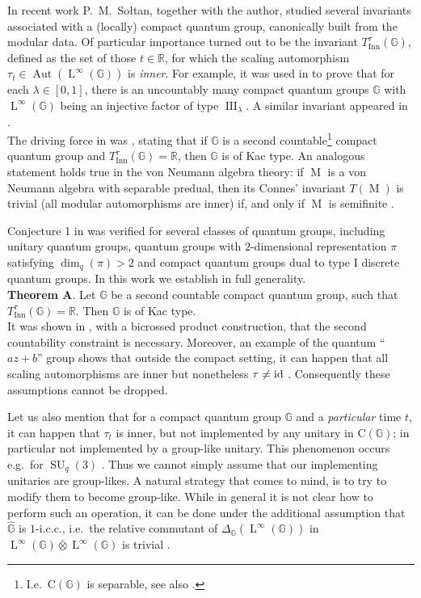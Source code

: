 \documentclass{amsart}
\newcommand{\id}{\textnormal{id}}
\newcommand{\mrm}{\mathrm}
\newcommand{\RR}{\mathbb{R}}
\newcommand{\GG}{\mathbb{G}}
\newcommand{\whG}{\widehat{\GG}}
\newcommand{\oon}{\operatorname}
\DeclareMathOperator{\M}{M}
\DeclareMathOperator{\LL}{L}
\DeclareMathOperator{\SU}{SU}
\DeclareMathOperator{\Inn}{Inn}
\DeclareMathOperator{\Aut}{Aut}
\theoremstyle{definition}
\numberwithin{equation}{section}
\begin{document}
In recent work \cite{KSInvariants} P.~M.~Sołtan, together with the author, studied several invariants associated with a (locally) compact quantum group, canonically built from the modular data. Of particular importance turned out to be the invariant $T^{\tau}_{\Inn}(\GG)$, defined as the set of those $t\in\RR$, for which the scaling automorphism $\tau_t\in \Aut(\LL^{\infty}(\GG))$ is \emph{inner}. For example, it was used in \cite{KSExamples} to prove that for each $\lambda\in \left[0,1\right]$, there is an uncountably many compact quantum groups $\GG$ with $\LL^{\infty}(\GG)$ being an injective factor of type $\oon{III}_\lambda$. A similar invariant appeared in \cite{VaesOuter}.\\

The driving force in \cite{KSInvariants} was \cite[Conjecture 1]{KSInvariants}, stating that if $\GG$ is a second countable\footnote{I.e.~$\mrm{C}(\GG)$ is separable, see also \cite[Lemma 14.6]{KrajczokCoamenability}.} compact quantum group and $T^{\tau}_{\Inn}(\GG)=\RR$, then $\GG$ is of Kac type. An analogous statement holds true in the von Neumann algebra theory: if $\M$ is a von Neumann algebra with separable predual, then its Connes' invariant $T(\M)$ is trivial (all modular automorphisms are inner) if, and only if $\M$ is semifinite \cite[Proposition 27.2]{Stratila}.


Conjecture 1 in \cite{KSInvariants} was verified for several classes of quantum groups, including unitary quantum groups, quantum groups with $2$-dimensional representation $\pi$ satisfying $\dim_q(\pi)>2$ and compact quantum groups dual to type I discrete quantum groups. In this work we establish \cite[Conjecture 1]{KSInvariants} in full generality.\\

\textbf{Theorem A}. Let $\GG$ be a second countable compact quantum group, such that $T^{\tau}_{\oon{Inn}}(\GG)=\RR$. Then $\GG$ is of Kac type.\\

It was shown in \cite[Remark 3.1]{KSInvariants}, with a bicrossed product construction, that the second countability constraint is necessary. Moreover, an example of the quantum ``$az+b$'' group shows that outside the compact setting, it can happen that all scaling automorphisms are inner but nonetheless $\tau\neq \id$ \cite[Section 5.2]{KSInvariants}. Consequently these assumptions cannot be dropped.

Let us also mention that for a compact quantum group $\GG$ and a \emph{particular} time $t$, it can happen that $\tau_t$ is inner, but not implemented by any unitary in $\mrm{C}(\GG)$; in particular not implemented by a group-like unitary. This phenomenon occurs e.g.~for $\SU_q(3)$ \cite[Proposition 4.16]{KSInvariants}. Thus we cannot simply assume that our implementing unitaries are group-likes. A natural strategy that comes to mind, is to try to modify them to become group-like. While in general it is not clear how to perform such an operation, it can be done under the additional assumption that $\whG$ is $1$-i.c.c., i.e.~the relative commutant of $\Delta_{\GG}(\LL^{\infty}(\GG))$ in $\LL^\infty(\GG)\bar\otimes\LL^{\infty}(\GG)$ is trivial \cite[Theorem 6.5]{KSInvariants}.\\
\end{document}
